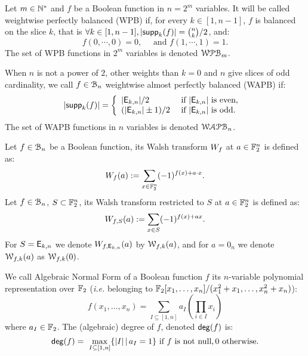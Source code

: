 \documentclass[11pt]{llncs}
\begin{document}
\begin{definition}\label{def:WAPB}
	Let $m\in \mathbb{N}^*$ and $f$ be a Boolean function in $n=2^m$ variables. It will be called weightwise perfectly balanced (WPB) if, for every $k\in[1,n-1]$, $f$ is balanced on the slice $k$, that is $\forall k \in [1,n-1], |\mathsf{supp}_{k}(f)|=\binom{n}{k}/2$, and:
	\[f(0,\cdots,0)=0,\quad \text{ and } f(1,\cdots,1)=1.\]	
	The set of WPB functions in $2^m$ variables is denoted $\mathcal{WPB}_{m}$.
	
	When $n$ is not a power of $2$, other weights than $k=0$ and $n$ give slices of odd cardinality, we call $f\in \mathcal{B}_{n}$ weightwise almost perfectly balanced (WAPB) if: 
	\[|\mathsf{supp}_{k}(f)|= \left \{
	\begin{array}{l l}
	|\mathsf{E}_{k,n}|/2  & \text{ if } |\mathsf{E}_{k,n}| \text{ is even, } \\
	(|\mathsf{E}_{k,n}|\pm 1)/2  & \text{ if }  |\mathsf{E}_{k,n}| \text{ is odd.}
	\end{array}\right.\]
	The set of WAPB functions in $n$ variables is denoted $\mathcal{WAPB}_{n}$.		
\end{definition}



\begin{definition}\label{def:walsh_transform}
	Let $f\in \mathcal{B}_{n}$ be a Boolean function, its Walsh transform $W_{f}$ at $a \in \mathbb{F}_2^n$ is defined as:
	\[  W_{f} (a) := \sum_{x \in \mathbb{F}_2^n} (-1)^{f(x) +  a \cdot x }.\]
	Let $f\in \mathcal{B}_{n}$, $S \subset \mathbb{F}_2^n$, its Walsh transform restricted to $S$ at $a \in \mathbb{F}_2^n$ is defined as:
	\[  W_{f,S} (a) := \sum_{x\in S} (-1)^{f(x)+ax}.\]
	For $S=\mathsf{E}_{k,n}$ we denote $W_{f,\mathsf{E}_{k,n}} (a)$ by $\mathcal{W}_{f,k}(a)$, and for $a= 0_{n}$ we denote $\mathcal{W}_{f,k}(a)$ as $\mathcal{W}_{f,k}(0)$.
\end{definition}


\begin{definition}\label{def:anf}
We call Algebraic Normal Form of a Boolean function $f$ its $n$-variable polynomial representation over $\mathbb{F}_2$ (\textit{i.e.} belonging to $\mathbb{F}_2[x_1,\dots,x_n]/(x_1^2+x_1,\dots,x_n^2+x_n)$):
	\[f(x_1,\dots,x_n)= \sum_{I \subseteq [1,n]} a_I \left( \prod_{i \in I} x_i \right) \]%
	where $a_I\in \mathbb{F}_2$. 
The (algebraic) degree of $f$, denoted $\mathsf{deg}(f)$ is: \[\mathsf{deg}(f)=\
\max_{I\subseteq [1,n]}\{ |I|\, | \, a_I=1\}  \text{ if $f$ is not null},0  \text{ otherwise}.\]
\end{definition}	
\end{document}
